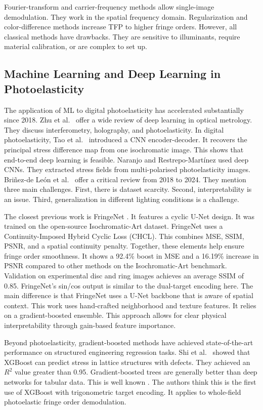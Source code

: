 \documentclass[review,12pt]{elsarticle}
\begin{document}
Fourier-transform and carrier-frequency methods \cite{quan1993,morimoto1994} allow single-image demodulation. They work in the spatial frequency domain. Regularization and color-difference methods \cite{quiroga1997,swain2014} increase TFP to higher fringe orders. However, all classical methods have drawbacks. They are sensitive to illuminants, require material calibration, or are complex to set up.

\subsection{Machine Learning and Deep Learning in Photoelasticity}

The application of ML to digital photoelasticity has accelerated substantially since 2018. Zhu et al.\ \cite{zhu2022} offer a wide review of deep learning in optical metrology. They discuss interferometry, holography, and photoelasticity. In digital photoelasticity, Tao et al.\ \cite{tao2022} introduced a CNN encoder-decoder. It recovers the principal stress difference map from one isochromatic image. This shows that end-to-end deep learning is feasible. Naranjo and Restrepo-Mart\'{i}nez \cite{naranjo2022} used deep CNNs. They extracted stress fields from multi-polarised photoelasticity images. Bri\~nez-de Le\'{o}n et al.\ \cite{brinezdeleon2024} offer a critical review from 2018 to 2024. They mention three main challenges. First, there is dataset scarcity. Second, interpretability is an issue. Third, generalization in different lighting conditions is a challenge.

The closest previous work is FringeNet \cite{mohan2024}. It features a cyclic U-Net design. It was trained on the open-source Isochromatic-Art dataset. FringeNet uses a Continuity-Imposed Hybrid Cyclic Loss (CHCL). This combines MSE, SSIM, PSNR, and a spatial continuity penalty. Together, these elements help ensure fringe order smoothness. It shows a 92.4\% boost in MSE and a 16.19\% increase in PSNR compared to other methods on the Isochromatic-Art benchmark. Validation on experimental disc and ring images achieves an average SSIM of 0.85. FringeNet's sin/cos output is similar to the dual-target encoding here. The main difference is that FringeNet uses a U-Net backbone that is aware of spatial context. This work uses hand-crafted neighborhood and texture features. It relies on a gradient-boosted ensemble. This approach allows for clear physical interpretability through gain-based feature importance.

Beyond photoelasticity, gradient-boosted methods have achieved state-of-the-art performance on structured engineering regression tasks. Shi et al.\ \cite{shi2023} showed that XGBoost can predict stress in lattice structures with defects. They achieved an $R^2$ value greater than 0.95. Gradient-boosted trees are generally better than deep networks for tabular data. This is well known \cite{chen2016,prokhorenkova2018}. The authors think this is the first use of XGBoost with trigonometric target encoding. It applies to whole-field photoelastic fringe order demodulation.
\end{document}
